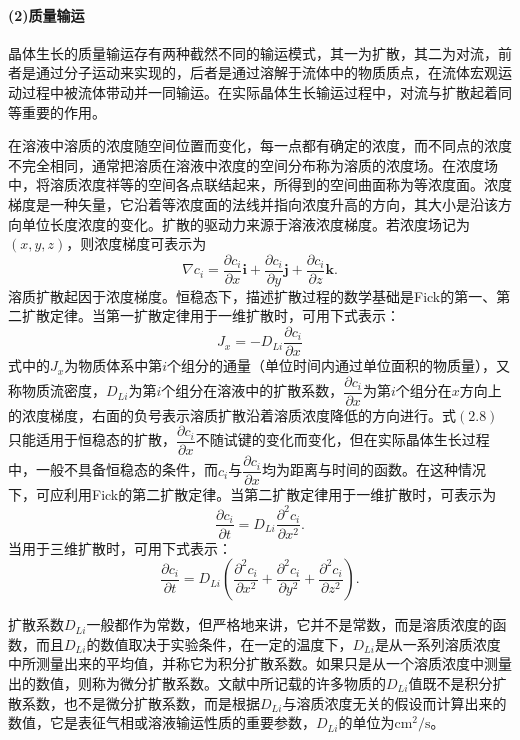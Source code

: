 \paragraph{(2)质量输运}晶体生长的质量输运存有两种截然不同的输运模式，其一为扩散，其二为对流，前者是通过分子运动来实现的，后者是通过溶解于流体中的物质质点，在流体宏观运动过程中被流体带动并一同输运。在实际晶体生长输运过程中，对流与扩散起着同等重要的作用。

在溶液中溶质的浓度随空间位置而变化，每一点都有确定的浓度，而不同点的浓度不完全相同，通常把溶质在溶液中浓度的空间分布称为溶质的浓度场。在浓度场中，将溶质浓度祥等的空间各点联结起来，所得到的空间曲面称为等浓度面。浓度梯度是一种矢量，它沿着等浓度面的法线并指向浓度升高的方向，其大小是沿该方向单位长度浓度的变化。扩散的驱动力来源于溶液浓度梯度。若浓度场记为$(x,y,z)$，则浓度梯度可表示为
\begin{equation}
\nabla c_i=\frac{\partial c_i}{\partial x} \bm{i}+ \frac{\partial c_i}{\partial y} \bm{j}+ \frac{\partial c_i}{\partial z} \bm{k}.
\end{equation}
溶质扩散起因于浓度梯度。恒稳态下，描述扩散过程的数学基础是Fick的第一、第二扩散定律。当第一扩散定律用于一维扩散时，可用下式表示：
\begin{equation}
J_x=-D_{Li}\frac{\partial c_i}{\partial x}
\end{equation}
式中的$J_x$为物质体系中第$i$个组分的通量（单位时间内通过单位面积的物质量），又称物质流密度，$D_{Li}$为第$i$个组分在溶液中的扩散系数，$\dfrac{\partial c_i}{\partial x}$为第$i$个组分在$x$方向上的浓度梯度，右面的负号表示溶质扩散沿着溶质浓度降低的方向进行。式$(2.8)$只能适用于恒稳态的扩散，$\dfrac{\partial c_i}{\partial x}$不随试键的变化而变化，但在实际晶体生长过程中，一般不具备恒稳态的条件，而$c_i$与$\dfrac{\partial c_i}{\partial x}$均为距离与时间的函数。在这种情况下，可应利用Fick的第二扩散定律。当第二扩散定律用于一维扩散时，可表示为
\begin{equation}
\frac{\partial c_i}{\partial t} = D_{Li}\frac{\partial^2c_i}{\partial x^2}.
\end{equation}
当用于三维扩散时，可用下式表示：
\begin{equation}
\frac{\partial c_i}{\partial t} = D_{Li}(\frac{\partial^2c_i}{\partial x^2}+\frac{\partial^2c_i}{\partial y^2}+\frac{\partial^2c_i}{\partial z^2}).
\end{equation}

扩散系数$D_{Li}$一般都作为常数，但严格地来讲，它并不是常数，而是溶质浓度的函数，而且$D_{Li}$的数值取决于实验条件，在一定的温度下，$D_{Li}$是从一系列溶质浓度中所测量出来的平均值，并称它为积分扩散系数。如果只是从一个溶质浓度中测量出的数值，则称为微分扩散系数。文献中所记载的许多物质的$D_{Li}$值既不是积分扩散系数，也不是微分扩散系数，而是根据$D_{Li}$与溶质浓度无关的假设而计算出来的数值，它是表征气相或溶液输运性质的重要参数，$D_{Li}$的单位为$\mathrm{cm^2/s}$。

